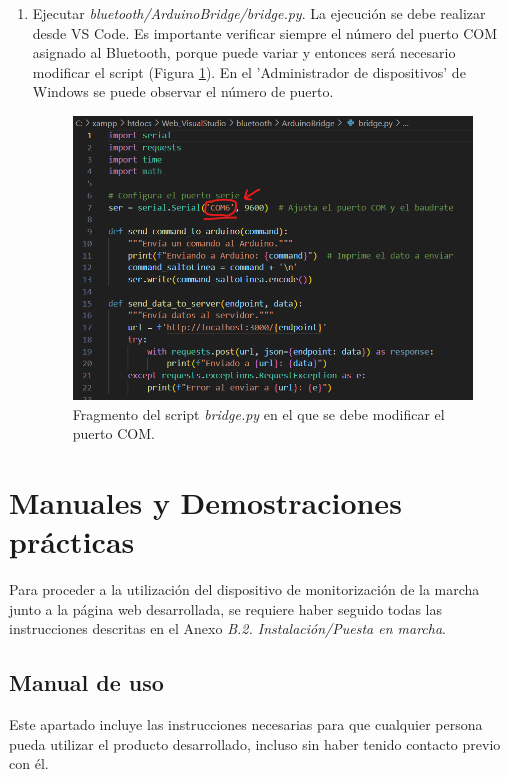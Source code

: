 \begin{enumerate}
    \item Ejecutar \textit{bluetooth/ArduinoBridge/bridge.py}. La ejecución se debe realizar desde VS Code. Es importante verificar siempre el número del puerto COM asignado al Bluetooth, porque puede variar y entonces será necesario modificar el script (Figura \ref{fig:com}). En el 'Administrador de dispositivos' de Windows se puede observar el número de puerto.
    \begin{figure}[h]
        \centering
        \includegraphics[width=1\textwidth]{img/B2_InstalacionPuestaMarcha/com.png}
        \caption{Fragmento del script \textit{bridge.py} en el que se debe modificar el puerto COM.}
        \label{fig:com}
    \end{figure}
    
\end{enumerate}


\section{Manuales y Demostraciones prácticas}

Para proceder a la utilización del dispositivo de monitorización de la marcha junto a la página web desarrollada, se requiere haber seguido todas las instrucciones descritas en el Anexo \textit{B.2. Instalación/Puesta en marcha}.

\subsection{Manual de uso}
Este apartado incluye las instrucciones necesarias para que cualquier persona pueda utilizar el producto desarrollado, incluso sin haber tenido contacto previo con él.

